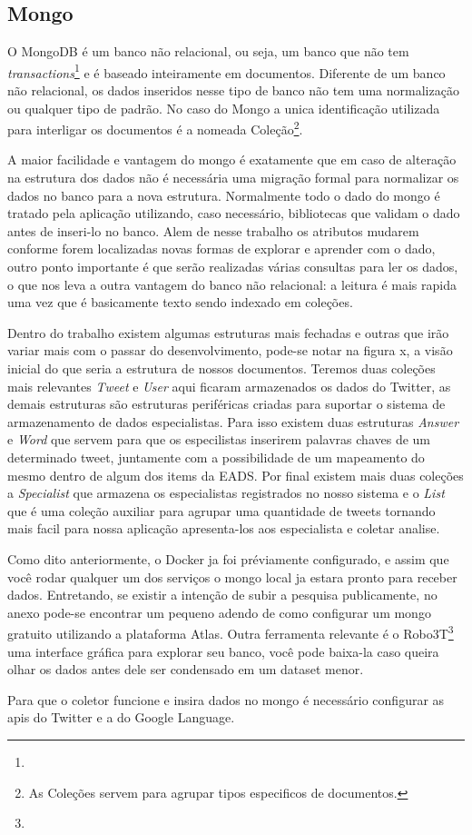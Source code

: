 \subsection{Mongo}
O MongoDB é um banco não relacional, ou seja, um banco que não tem \textit{transactions}\footnote{} e é baseado inteiramente em documentos. Diferente de um banco não relacional, os dados inseridos nesse tipo de banco não tem uma normalização ou qualquer tipo de padrão. No caso do Mongo a unica identificação utilizada para interligar os documentos é a nomeada Coleção\footnote{As Coleções servem para agrupar tipos especificos de documentos.}.

A maior facilidade e vantagem do mongo é exatamente que em caso de alteração na estrutura dos dados não é necessária uma migração formal para normalizar os dados no banco para a nova estrutura. Normalmente todo o dado do mongo é tratado pela aplicação utilizando, caso necessário, bibliotecas que validam o dado antes de inseri-lo no banco. Alem de nesse trabalho os atributos mudarem conforme forem localizadas novas formas de explorar e aprender com o dado, outro ponto importante é que serão realizadas várias consultas para ler os dados, o que nos leva a outra vantagem do banco não relacional: a leitura é mais rapida uma vez que é basicamente texto sendo indexado em coleções.

Dentro do trabalho existem algumas estruturas mais fechadas e outras que irão variar mais com o passar do desenvolvimento, pode-se notar na figura x, a visão inicial do que seria a estrutura de nossos documentos. Teremos duas coleções mais relevantes \textit{Tweet} e \textit{User} aqui ficaram armazenados os dados do Twitter, as demais estruturas são estruturas periféricas criadas para suportar o sistema de armazenamento de dados especialistas. Para isso existem duas estruturas \textit{Answer} e \textit{Word} que servem para que os especilistas inserirem palavras chaves de um determinado tweet, juntamente com a possibilidade de um mapeamento do mesmo dentro de algum dos items da EADS. Por final existem mais duas coleções a \textit{Specialist} que armazena os especialistas registrados no nosso sistema e o \textit{List} que é uma coleção auxiliar para agrupar uma quantidade de tweets tornando mais facil para nossa aplicação apresenta-los aos especialista e coletar analise.

Como dito anteriormente, o Docker ja foi préviamente configurado, e assim que você rodar qualquer um dos serviços o mongo local ja estara pronto para receber dados. Entretando, se existir a intenção de subir a pesquisa publicamente, no anexo pode-se encontrar um pequeno adendo de como configurar um mongo gratuito utilizando a plataforma Atlas. Outra ferramenta relevante é o Robo3T\footnote{} uma interface gráfica para explorar seu banco, você pode baixa-la caso queira olhar os dados antes dele ser condensado em um dataset menor.

Para que o coletor funcione e insira dados no mongo é necessário configurar as apis do Twitter e a do Google Language.